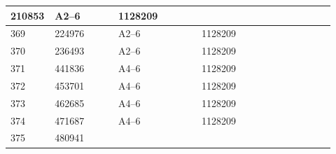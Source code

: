 \documentclass[UTF8,10pt,a4paper,fontset=fandol]{ctexart}
\newcommand{\fieldvalue}[1]{#1}
\begin{document}
\begin{center}
\begin{tabular}{|p{0.08\linewidth}|p{0.19\linewidth}|p{0.25\linewidth}|p{0.25\linewidth}|p{0.15\linewidth}|}
\fieldvalue{210853} &
\fieldvalue{A2--6} &
\fieldvalue{1128209} & \\ \hline
\fieldvalue{369} &
\fieldvalue{224976} &
\fieldvalue{A2--6} &
\fieldvalue{1128209} & \\ \hline
\fieldvalue{370} &
\fieldvalue{236493} &
\fieldvalue{A2--6} &
\fieldvalue{1128209} & \\ \hline
\fieldvalue{371} &
\fieldvalue{441836} &
\fieldvalue{A4--6} &
\fieldvalue{1128209} & \\ \hline
\fieldvalue{372} &
\fieldvalue{453701} &
\fieldvalue{A4--6} &
\fieldvalue{1128209} & \\ \hline
\fieldvalue{373} &
\fieldvalue{462685} &
\fieldvalue{A4--6} &
\fieldvalue{1128209} & \\ \hline
\fieldvalue{374} &
\fieldvalue{471687} &
\fieldvalue{A4--6} &
\fieldvalue{1128209} & \\ \hline
\fieldvalue{375} &
\fieldvalue{480941} &

\end{tabular}
\end{center}
\end{document}
